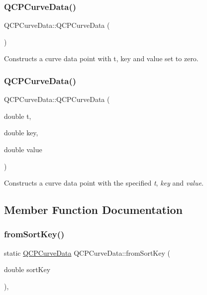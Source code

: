 \subsubsection{\texorpdfstring{Q\+C\+P\+Curve\+Data()}{QCPCurveData()}\hspace{0.1cm}{\footnotesize\ttfamily [1/2]}}
{\footnotesize\ttfamily Q\+C\+P\+Curve\+Data\+::\+Q\+C\+P\+Curve\+Data (\begin{DoxyParamCaption}{ }\end{DoxyParamCaption})}

Constructs a curve data point with t, key and value set to zero. \mbox{\label{class_q_c_p_curve_data_a3586be0cc6f8db15bcdd0c0d03b0c173}} 
\subsubsection{\texorpdfstring{Q\+C\+P\+Curve\+Data()}{QCPCurveData()}\hspace{0.1cm}{\footnotesize\ttfamily [2/2]}}
{\footnotesize\ttfamily Q\+C\+P\+Curve\+Data\+::\+Q\+C\+P\+Curve\+Data (\begin{DoxyParamCaption}\item[{double}]{t,  }\item[{double}]{key,  }\item[{double}]{value }\end{DoxyParamCaption})}

Constructs a curve data point with the specified {\itshape t}, {\itshape key} and {\itshape value}. 

\subsection{Member Function Documentation}
\mbox{\label{class_q_c_p_curve_data_a40adf1a6ba93051c415a65298b49aa6e}} 
\subsubsection{\texorpdfstring{from\+Sort\+Key()}{fromSortKey()}}
{\footnotesize\ttfamily static \hyperlink{class_q_c_p_curve_data}{Q\+C\+P\+Curve\+Data} Q\+C\+P\+Curve\+Data\+::from\+Sort\+Key (\begin{DoxyParamCaption}\item[{double}]{sort\+Key }\end{DoxyParamCaption})\hspace{0.3cm}{\ttfamily [inline]}, {\ttfamily [static]}}

